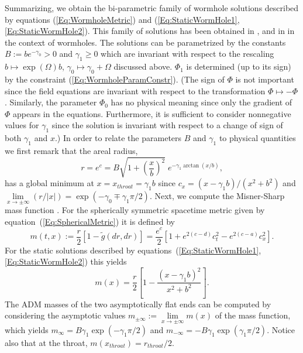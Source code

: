 \documentclass[           %
               showpacs,            %
               preprintnumbers,     %
               aps,                 %
               prd,                 %
               superscriptaddress,      %
               nofootinbib,         %
               tightenlines,        %
               floats,floatfix      %
               ]{revtex4}
\begin{document}
Summarizing, we obtain the bi-parametric family of wormhole solutions
described by equations (\ref{Eq:WormholeMetric}) and
(\ref{Eq:StaticWormHole1},\ref{Eq:StaticWormHole2}). This family of
solutions has been obtained in \cite{hE73,kB73}, and in \cite{cA02} in
the context of wormholes. The solutions can be parametrized by the
constants $B := b e^{-\gamma_0} > 0$ and $\gamma_1 \geq 0$ which are
invariant with respect to the rescaling $b \mapsto \exp(\Omega) b$,
$\gamma_0 \mapsto \gamma_0 + \Omega$ discussed above. $\Phi_1$ is
determined (up to its sign) by the constraint
(\ref{Eq:WormholeParamConstr}). (The sign of $\Phi$ is not important
since the field equations are invariant with respect to the
transformation $\Phi \mapsto -\Phi$. Similarly, the parameter $\Phi_0$
has no physical meaning since only the gradient of $\Phi$ appears in
the equations. Furthermore, it is sufficient to consider nonnegative
values for $\gamma_1$ since the solution is invariant with respect to
a change of sign of both $\gamma_1$ and $x$.) In order to relate the
parameters $B$ and $\gamma_1$ to physical quantities we first remark
that the areal radius,
\begin{displaymath}
r = e^c = B\sqrt{1 + \left(\frac{x}{b}\right)^2}\; 
e^{-\gamma_1\arctan(x/b)},
\end{displaymath}
has a global minimum at $x = x_{throat} = \gamma_1 b$ since $c_x = (x
- \gamma_1 b)/(x^2 + b^2)$ and $\lim\limits_{x\to\pm\infty} (r/|x|) =
\exp(-\gamma_0 \mp \gamma_1\pi/2)$. Next, we compute the Misner-Sharp
mass function \cite{cMdS64}. For the spherically symmetric spacetime
metric given by equation~(\ref{Eq:SphericalMetric}) it is defined by
\begin{displaymath}
m(t,x) := \frac{r}{2}\left[ 1 - \tilde{g}(dr,dr) \right] 
 = \frac{e^c}{2}\left[ 1 + e^{2(c-d)} c_t^2 - e^{2(c-a)} c_x^2 \right].
\end{displaymath}
For the static solutions described by
equations~(\ref{Eq:StaticWormHole1},\ref{Eq:StaticWormHole2}) this
yields
\begin{displaymath}
m(x) = \frac{r}{2}\left[ 1 - \frac{(x - \gamma_1 b)^2}{x^2 + b^2} \right].
\end{displaymath}
The ADM masses of the two asymptotically flat ends can be computed by
considering the asymptotic values $m_{\pm\infty} :=
\lim\limits_{x\to\pm\infty} m(x)$ of the mass function, which yields
$m_\infty = B\gamma_1\exp(-\gamma_1\pi/2)$ and $m_{-\infty} =
-B\gamma_1\exp(\gamma_1\pi/2)$. Notice also that at the throat,
$m(x_{throat}) = r_{throat}/2$.
\end{document}
